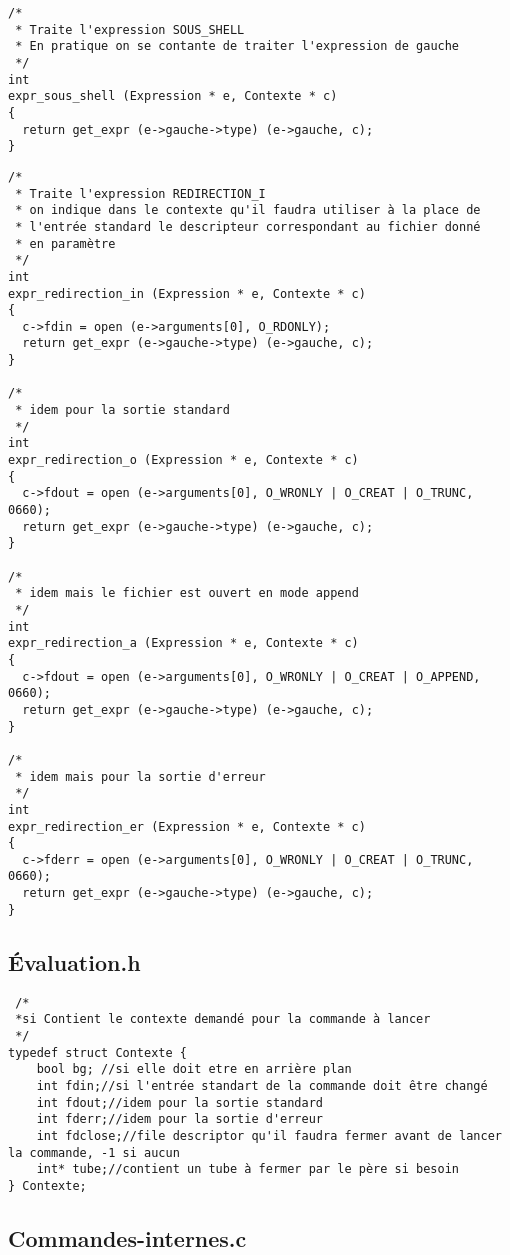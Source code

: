 \documentclass[12pt]{article}
\begin{document}
\label{sousshell}
\begin{verbatim}
/*
 * Traite l'expression SOUS_SHELL
 * En pratique on se contante de traiter l'expression de gauche
 */
int
expr_sous_shell (Expression * e, Contexte * c)
{
  return get_expr (e->gauche->type) (e->gauche, c);
}
\end{verbatim}
\label{redirection}
\begin{verbatim}
/*
 * Traite l'expression REDIRECTION_I
 * on indique dans le contexte qu'il faudra utiliser à la place de
 * l'entrée standard le descripteur correspondant au fichier donné
 * en paramètre
 */
int
expr_redirection_in (Expression * e, Contexte * c)
{
  c->fdin = open (e->arguments[0], O_RDONLY);
  return get_expr (e->gauche->type) (e->gauche, c);
}

/*
 * idem pour la sortie standard
 */
int
expr_redirection_o (Expression * e, Contexte * c)
{
  c->fdout = open (e->arguments[0], O_WRONLY | O_CREAT | O_TRUNC, 0660);
  return get_expr (e->gauche->type) (e->gauche, c);
}

/*
 * idem mais le fichier est ouvert en mode append
 */
int
expr_redirection_a (Expression * e, Contexte * c)
{
  c->fdout = open (e->arguments[0], O_WRONLY | O_CREAT | O_APPEND, 0660);
  return get_expr (e->gauche->type) (e->gauche, c);
}

/*
 * idem mais pour la sortie d'erreur
 */
int
expr_redirection_er (Expression * e, Contexte * c)
{
  c->fderr = open (e->arguments[0], O_WRONLY | O_CREAT | O_TRUNC, 0660);
  return get_expr (e->gauche->type) (e->gauche, c);
}
\end{verbatim}

\subsection{Évaluation.h}
\label{Eval.h}
\begin{verbatim}
 /*
 *si Contient le contexte demandé pour la commande à lancer
 */
typedef struct Contexte {
    bool bg; //si elle doit etre en arrière plan
    int fdin;//si l'entrée standart de la commande doit être changé
    int fdout;//idem pour la sortie standard
    int fderr;//idem pour la sortie d'erreur
    int fdclose;//file descriptor qu'il faudra fermer avant de lancer la commande, -1 si aucun
    int* tube;//contient un tube à fermer par le père si besoin
} Contexte;
\end{verbatim}

\subsection{Commandes-internes.c}
\end{document}
